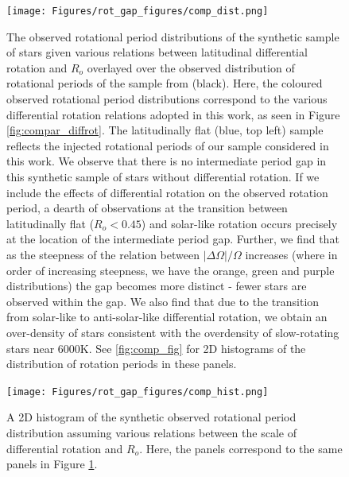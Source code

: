 \begin{figure}
\centering
  \texttt{[image: Figures/rot\_gap\_figures/comp\_dist.png]}
  \caption[The observed rotational period distributions of the synthetic sample of stars given various relations between latitudinal differential rotation and $R_o$ overlayed over the observed distribution of rotational periods of the \kepler{} sample from \citet{mcquillan_rotation_2014} (black).]{
  	The observed rotational period distributions of the synthetic sample of stars given various relations between latitudinal differential rotation and $R_o$ overlayed over the observed distribution of rotational periods of the \kepler{} sample from \citet{mcquillan_rotation_2014} (black). Here, the coloured observed rotational period distributions correspond to the various differential rotation relations adopted in this work, as seen in Figure \ref{fig:compar_diffrot}. The latitudinally flat (blue, top left) sample reflects the injected rotational periods of our sample considered in this work. We observe that there is no intermediate period gap in this synthetic sample of stars without differential rotation. If we include the effects of differential rotation on the observed rotation period, a dearth of observations at the transition between latitudinally flat ($R_o<0.45$) and solar-like rotation occurs precisely at the location of the intermediate period gap. 
 Further, we find that as the steepness of the relation between $|\Delta \Omega| / \Omega$ increases (where in order of increasing steepness, we have the orange, green and purple distributions) the gap becomes more distinct - fewer stars are observed within the gap. We also find that due to the transition from solar-like to anti-solar-like differential rotation, we obtain an over-density of stars consistent with the overdensity of slow-rotating stars near 6000K. See \ref{fig:comp_fig} for 2D histograms of the distribution of rotation periods in these panels.}
  \label{fig:comp_dist}
\end{figure}

\begin{figure}
\centering
  \texttt{[image: Figures/rot\_gap\_figures/comp\_hist.png]}
  \caption[A 2D histogram of the synthetic observed rotational period distribution assuming various relations between the scale of differential rotation and $R_o$.]{
  	A 2D histogram of the synthetic observed rotational period distribution assuming various relations between the scale of differential rotation and $R_o$. Here, the panels correspond to the same panels in Figure \ref{fig:comp_dist}.}
  \label{fig:comp_hist}
\end{figure}

